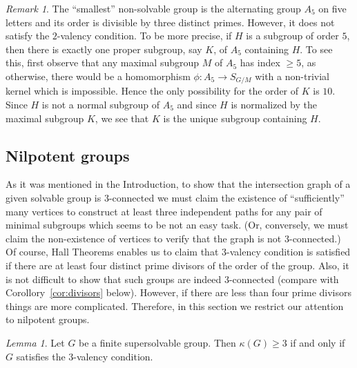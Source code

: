 \documentclass[a4paper,12pt]{article}
\theoremstyle{definition}
\theoremstyle{remark}
\newtheorem*{rem}{Remark}
\theoremstyle{theorem}
\newtheorem{lem}[theorem]{Lemma}
\begin{document}
\begin{rem}
  The ``smallest'' non-solvable group is the alternating group $A_5$
  on five letters and its order is divisible by three distinct
  primes. However, it does not satisfy the $2$-valency condition. To be
  more precise, if $H$ is a subgroup of order $5$, then there is
  exactly one proper subgroup, say $K$, of $A_5$ containing $H$. To
  see this, first observe that any maximal subgroup $M$ of $A_5$ has
  index $\geq 5$, as otherwise, there would be a homomorphism
  $\phi\colon A_5\to S_{G/M}$ with a non-trivial kernel which is
  impossible. Hence the only possibility for the order of $K$ is
  $10$. Since $H$ is not a normal subgroup of $A_5$ and since $H$ is normalized by the maximal subgroup $K$, we see that $K$ is the unique subgroup containing $H$.
\end{rem}



\subsection*{Nilpotent groups}


As it was mentioned in the Introduction, to show that the intersection graph of a given solvable group is $3$-connected we must claim the existence of ``sufficiently'' many vertices to construct at least three independent paths for any pair of minimal subgroups which seems to be not an easy task. (Or, conversely, we must claim the non-existence of vertices to verify that the graph is not $3$-connected.) Of course, Hall Theorems enables us to claim that $3$-valency condition is satisfied if there are at least four distinct prime divisors of the order of the group. Also, it is not difficult to show that such groups are indeed $3$-connected (compare with Corollory~\ref{cor:divisors} below). However, if there are less than four prime divisors things are more complicated. Therefore, in this section we restrict our attention to nilpotent groups.   

\begin{lem}\label{lem:valency3}
  Let $G$ be a finite supersolvable group. Then $\kappa(G)\geq 3$ if and
  only if $G$ satisfies the $3$-valency condition.
\end{lem}
\end{document}

